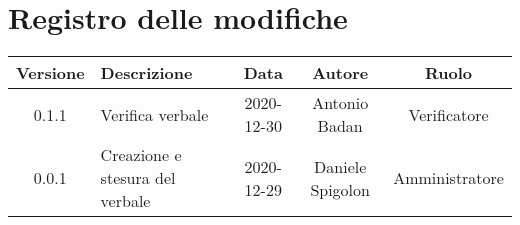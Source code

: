 \section*{Registro delle modifiche}

\begin{center}
	\begin{longtable}{|c|p{5cm}|c|c|c|}
	\hline
	\rowcolor{lighter-grayer}
	\textbf{Versione} & \textbf{Descrizione} & \textbf{Data} & \textbf{Autore} & \textbf{Ruolo} \\
	\hline
	\endfirsthead


	0.1.1 & Verifica verbale & 2020-12-30 & Antonio Badan & Verificatore \\
	\hline
	0.0.1 & Creazione e stesura del verbale & 2020-12-29 & Daniele Spigolon & Amministratore \\
	\hline
	\end{longtable}
\end{center}